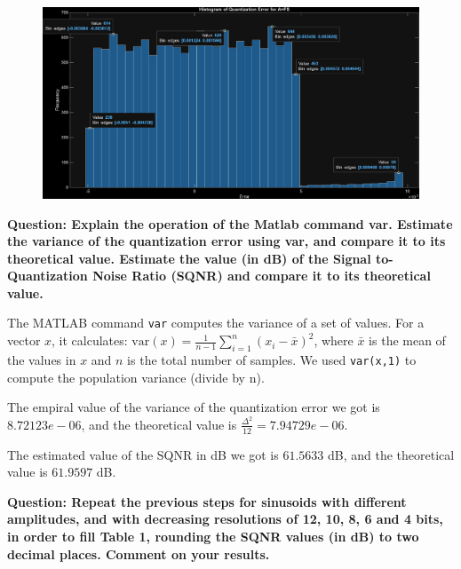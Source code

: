\documentclass[11pt,a4paper]{article}
\begin{document}
\begin{figure}[H]
    \centering
    \includegraphics[width=1\textwidth]{img/task2_1.png}
    \label{fig:task2_1}
\end{figure}

\vspace{1cm}
\textbf{Question: Explain the operation of the Matlab command var. Estimate the variance of the quantization error using var,
    and compare it to its theoretical value. Estimate the value (in dB) of the Signal to-Quantization Noise Ratio (SQNR)
    and compare it to its theoretical value.
}

\vspace{0.5cm}
The MATLAB command \texttt{var} computes the variance of a set of values. For a vector $x$, it calculates:
$\text{var}(x) = \frac{1}{n-1}\sum_{i=1}^n (x_i - \bar{x})^2$, where $\bar{x}$ is the mean of the values in $x$ and $n$ is the total number of samples.
We used \texttt{var(x,1)} to compute the population variance (divide by n).

The empiral value of the variance of the quantization error we got is $8.72123e-06$, and the theoretical value is $\frac{\Delta^2}{12} = 7.94729e-06$.

The estimated value of the SQNR in dB we got is $61.5633$ dB, and the theoretical value is $61.9597$ dB.

\vspace{1cm}
\textbf{Question: Repeat the previous steps for sinusoids with different amplitudes, and with decreasing resolutions
    of 12, 10, 8, 6 and 4 bits, in order to fill Table 1, rounding the SQNR values (in dB) to two
    decimal places. Comment on your results.
}
\end{document}
